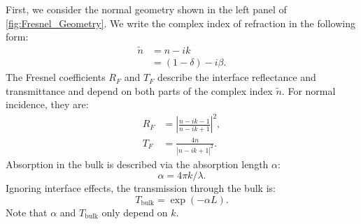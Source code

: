First, we consider the normal geometry shown in the left panel of \cref{fig:Fresnel_Geometry}. We write the complex index of refraction in the following form:
\begin{equation}
\begin{aligned}
\tilde{n} &= n - i k \\
&= (1-\delta) - i \beta.
\end{aligned}
\label{eqn:complex_index}
\end{equation}
The Fresnel coefficients $R_F$ and $T_F$ describe the interface reflectance and transmittance and depend on both parts of the complex index $\tilde{n}$. For normal incidence, they are:
\begin{equation}
\begin{aligned}
R_F &= \left| \frac{n-ik-1}{n-ik+1}   \right|^2, \\
T_F &=  \frac{4n}{\left|n-ik+1\right|^2}.
\end{aligned}
\label{eqn:fresnel_normal}
\end{equation}
Absorption in the bulk is described via the absorption length $\alpha$:
\begin{equation}
\alpha = 4 \pi k / \lambda.
\end{equation}
Ignoring interface effects, the transmission through the bulk is:
\begin{equation}
T_{\text{bulk}} = \exp( - \alpha L).
\end{equation}
Note that $\alpha$ and $T_{\text{bulk}}$ only depend on $k$.

